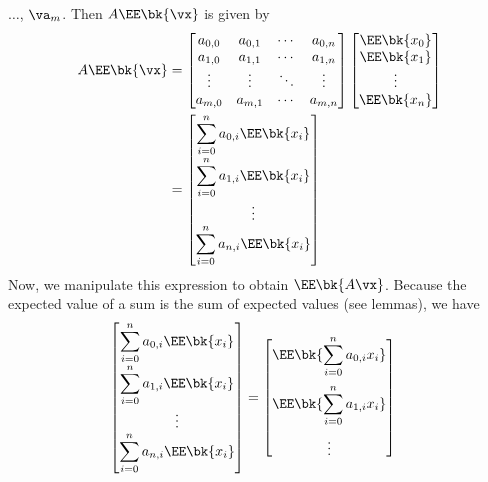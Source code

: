\documentclass[189]{pset}
\begin{document}
\begin{enumerate}
        $\ldots$, $\va_m$. Then $A\EE\bk{\vx}$ is given by
        \begin{align*}
          A\EE\bk{\vx}
          &=
            \begin{bmatrix}
              a_{0,0} & a_{0,1} & \cdots & a_{0,n} \\
              a_{1,0} & a_{1,1} & \cdots & a_{1,n} \\
              \vdots & \vdots & \ddots & \vdots \\
              a_{m,0} & a_{m,1} & \cdots & a_{m,n}
            \end{bmatrix}
            \begin{bmatrix}
              \EE\bk{x_0} \\
              \EE\bk{x_1} \\
              \vdots \\
              \EE\bk{x_n}
            \end{bmatrix} \\
          &=
            \begin{bmatrix}
              \displaystyle\sum_{i=0}^n a_{0,i}\EE\bk{x_i} \\[1em]
              \displaystyle\sum_{i=0}^n a_{1,i}\EE\bk{x_i} \\[1em]
              \vdots\\
              \displaystyle\sum_{i=0}^n a_{n,i}\EE\bk{x_i}
            \end{bmatrix}
        \end{align*}
        Now, we manipulate this expression to obtain $\EE\bk{A\vx}$.
        Because the expected value of a sum is the sum of expected
        values (see lemmas), we have
        \begin{align*}
          \begin{bmatrix}
            \displaystyle\sum_{i=0}^n a_{0,i}\EE\bk{x_i} \\[1em]
            \displaystyle\sum_{i=0}^n a_{1,i}\EE\bk{x_i} \\[1em]
            \vdots\\
            \displaystyle\sum_{i=0}^n a_{n,i}\EE\bk{x_i}
          \end{bmatrix}
          &=
            \begin{bmatrix}
              \displaystyle\EE\bk{\sum_{i=0}^n a_{0,i}x_i} \\[1.5em]
              \displaystyle\EE\bk{\sum_{i=0}^n a_{1,i}x_i} \\[1.5em]
              \vdots\\

\end{bmatrix}
\end{align*}
\end{enumerate}
\end{document}
